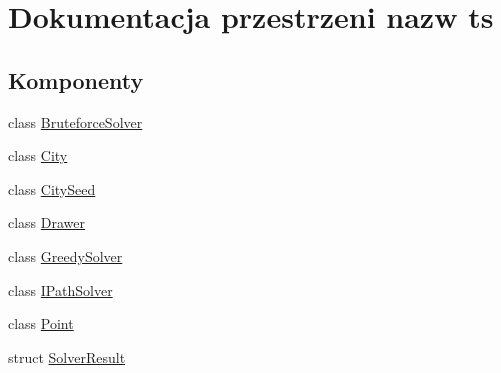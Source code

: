 \hypertarget{namespacets}{}\section{Dokumentacja przestrzeni nazw ts}
\label{namespacets}
\subsection*{Komponenty}
\begin{DoxyCompactItemize}
\item 
class \mbox{\hyperlink{classts_1_1_bruteforce_solver}{Bruteforce\+Solver}}
\item 
class \mbox{\hyperlink{classts_1_1_city}{City}}
\item 
class \mbox{\hyperlink{classts_1_1_city_seed}{City\+Seed}}
\item 
class \mbox{\hyperlink{classts_1_1_drawer}{Drawer}}
\item 
class \mbox{\hyperlink{classts_1_1_greedy_solver}{Greedy\+Solver}}
\item 
class \mbox{\hyperlink{classts_1_1_i_path_solver}{I\+Path\+Solver}}
\item 
class \mbox{\hyperlink{classts_1_1_point}{Point}}
\item 
struct \mbox{\hyperlink{structts_1_1_solver_result}{Solver\+Result}}
\end{DoxyCompactItemize}
